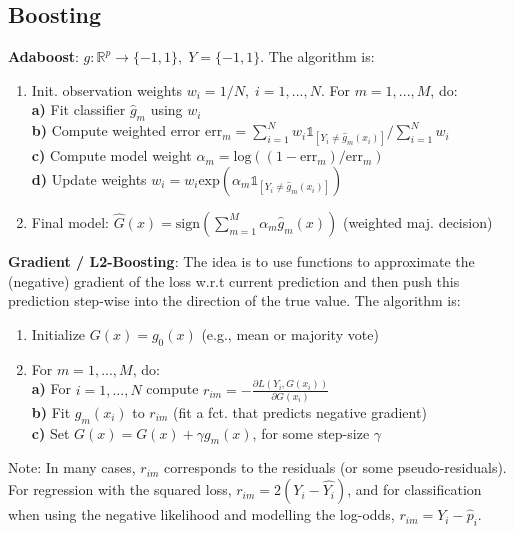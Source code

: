 \subsection*{Boosting}
\textbf{Adaboost}: $g \colon \mathbb{R}^p \to \{-1, 1\}, \; Y = \{-1, 1\}$. The algorithm is: \\
\begin{enumerate}
    \item Init. observation weights $w_i = 1/N, \; i=1,...,N$. For $m=1,...,M$, do: \\
        \textbf{a)} Fit classifier $\hat{g}_m$ using $w_i$ \\
        \textbf{b)} Compute weighted error $\text{err}_m = \sum_{i=1}^N w_i \mathds{1}_{[Y_i \neq \hat{g}_m(x_i)]} / \sum_{i=1}^N w_i$ \\
        \textbf{c)} Compute model weight $\alpha_m = \text{log}\left( (1- \text{err}_m) / \text{err}_m \right)$ \\
        \textbf{d)} Update weights $w_i = w_i \text{exp}\left(\alpha_m \mathds{1}_{[Y_i \neq \hat{g}_m(x_i)]}\right)$
    \item Final model: $\hat{G}(x) = \text{sign}\left(\sum_{m=1}^M \alpha_m \hat{g}_m(x)\right)$ (weighted maj. decision) 
\end{enumerate}

\textbf{Gradient / L2-Boosting}: The idea is to use functions to approximate the (negative) gradient of the loss w.r.t current prediction and then push this prediction step-wise into the direction of the true value. The algorithm is:
\begin{enumerate}
    \item Initialize $G(x) = g_0(x)$ (e.g., mean or majority vote)
    \item For $m=1,...,M$, do:\\
        \textbf{a)} For $i = 1,...,N$ compute $r_{im} = -\frac{\partial L(Y_i, G(x_i))}{\partial G(x_i)}$ \\
        \textbf{b)} Fit $g_m(x_i)$ to $r_{im}$ (fit a fct. that predicts negative gradient) \\
        \textbf{c)} Set $G(x) = G(x) + \gamma g_m(x)$, for some step-size $\gamma$ \\
\end{enumerate}
Note: In many cases, $r_{im}$ corresponds to the residuals (or some pseudo-residuals). For regression with the squared loss, $r_{im}=2(Y_i - \hat{Y_i})$, and for classification when using the negative likelihood and modelling the log-odds, $r_{im} = Y_i - \hat{p}_i$. \\

